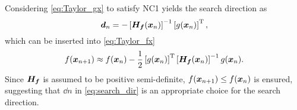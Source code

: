 Considering \eqref{eq:Taylor_gx} to satisfy NC1 yields the search direction as
\begin{equation} \label{eq:search_dir}
	\dd{n} = - \left[ \Hess (\iter{n}) \right]^{-1} \left[ \gradf (\iter{n}) \right]^{\T},
\end{equation}
which can be inserted into \eqref{eq:Taylor_fx} 
\begin{equation}
	f (\bm{x}_{n + 1}) \approx f (\bm{x}_{n}) - \frac{1}{2} \left[ g (\bm{x}_{n}) \right]^{\operatorname{T}} \left[ \bm{H_{f}} (\bm{x}_{n}) \right]^{-1} g (\bm{x}_{n}).
\end{equation}
Since $\bm{H_{f}}$ is assumed to be positive semi-definite, $f (\bm{x}_{n + 1}) \leq f (\bm{x}_{n})$ is ensured, suggesting that $\dd{n}$ in \eqref{eq:search_dir} is an appropriate choice for the search direction. \par
